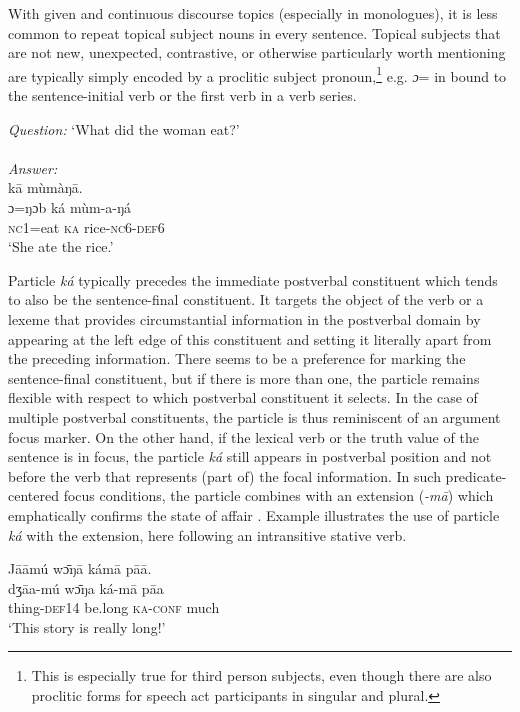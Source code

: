 \documentclass[output=paper]{langsci/langscibook}
\begin{document}
With given and continuous discourse topics (especially in monologues), it is less common to repeat topical subject nouns in every sentence. Topical subjects that are not new, unexpected, contrastive, or otherwise particularly worth mentioning are typically simply encoded by a proclitic subject pronoun,\footnote{This is especially true for third person subjects, even though there are also proclitic forms for speech act participants in singular and plural.} e.g. \textit{ɔ}= in  bound to the sentence-initial verb or the first verb in a verb series. 

\ea\label{ex:schwarz:8}
\textit{Question:} `What did the woman eat?'\\
\textup{ } \\
\textit{Answer:}\\
  k\={a}  mùmàŋ\={a}.\\
  \textup{ɔ=ŋɔb}    {ká}  {mùm-a-ŋá}\\
     \textsc{nc1}=eat  \textsc{ka}  rice-\textsc{nc}6-\textsc{def}6\\
\glt ‘She ate the rice.’
\z

Particle \textit{ká} typically precedes the immediate postverbal constituent which tends to also be the sentence-final constituent. It targets the object of the verb or a lexeme that provides circumstantial information in the postverbal domain by appearing at the left edge of this constituent and setting it literally apart from the preceding information. There seems to be a preference for marking the sentence-final constituent, but if there is more than one, the particle remains flexible with respect to which postverbal constituent it selects. In the case of multiple postverbal constituents, the particle is thus reminiscent of an argument focus marker. On the other hand, if the lexical verb or the truth value of the sentence is in focus, the particle \textit{ká} still appears in postverbal position and not before the verb that represents (part of) the focal information. In such predicate-centered focus conditions, the particle combines with an extension (\textit{-m\={a}}) which emphatically confirms the state of affair \citep{Schwarz2010b}. Example  illustrates the use of particle \textit{ká} with the extension, here following an intransitive stative verb.

\ea\label{ex:schwarz:9}
\glll   J\={a}\={a}mú    w\={ɔ}ŋ\={a}    kám\={a}    p\={a}\={a}.\\
  \textup{dʒ\={a}a-mú}  w\={ɔ}ŋa    {ká-m\={a}}    {p\={a}a}\\
thing-\textsc{def}14  be.long  \textsc{ka}-\textsc{conf}  much\\
\glt ‘This story is really long!’
\z
\end{document}
